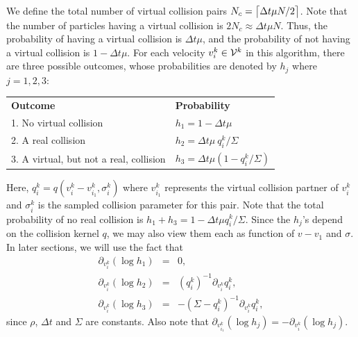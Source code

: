 \documentclass[12pt,nopreprintline]{elsarticle}
\DeclarePairedDelimiter{\ceil}{\lceil}{\rceil}
\begin{document}
We define  the total number of virtual collision pairs $N_c =\ceil[\big]{ \Delta t \mu N/2}$. Note that the number of particles having a virtual collision is $2N_c \approx \Delta t \mu N$. Thus, the probability of having a virtual collision is $\Delta t \mu$, and the probability of not having a virtual collision is $1-\Delta t \mu$. For each velocity $v_i^k\in {\cal V}^k $ in this algorithm,  there are three possible outcomes, whose probabilities are denoted by $h_j$ where $j=1,2,3$:
%
\begin{center}
\begin{tabular}{ll}
\textbf{Outcome} &   \textbf{Probability} \\
1. No virtual collision  & $h_1 = 1-\Delta t \mu$  \\
2. A real collision      & $h_2 = \Delta t \mu \  q_i^k /\Sigma  $ \\
3. A virtual, but not a real, collision  &  $h_3 = \Delta t \mu (1- q_i^k /\Sigma)$ \\
\end{tabular}
\end{center}
Here, $q_i^k = q(v_i^k-v_{i_1}^k,\sigma_i^k)$ where $v_{i_1}^k$ represents the virtual collision partner of $v_i^k$ and $\sigma_i^k$ is the sampled collision parameter for this pair. Note that the total probability of no real collision is $h_1+h_3= 1 - \Delta t \mu q_i^k/\Sigma$. Since the $h_j$'s depend on the collision kernel $q$, we may also view them each as function of $v-v_1$ and $\sigma$. In later sections, we will use the fact that
\begin{eqnarray*}
\partial_{v_i^k} (\log h_1) &=& 0, \nonumber  \\
\partial_{v_i^k} (\log h_2) &=& (q_i^k)^{-1}  \partial_{v_i^k} q_i^k, \\
\partial_{v_i^k} (\log h_3)&=& - (\Sigma -q_i^k)^{-1}  \partial_{v_i^k} q_i^k,   \nonumber
\end{eqnarray*}
since $\rho$, $\Delta t$ and $\Sigma$ are constants. Also note that $\partial_{v_{i_1}^k} (\log h_j)= - \partial_{v_{i}^k} (\log h_j)$.
\end{document}
